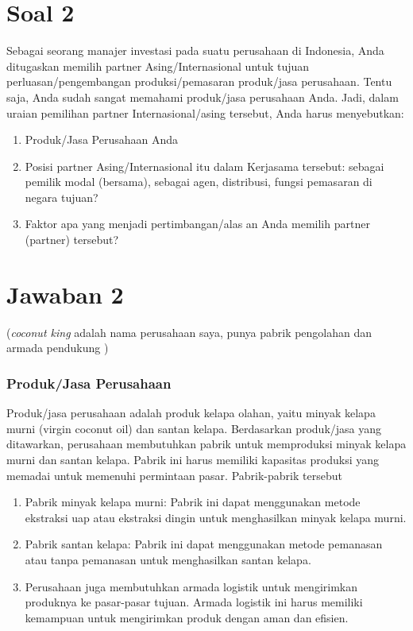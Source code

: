 \documentclass[12pt]{article}
\begin{document}
\section*{Soal 2}
Sebagai seorang manajer investasi pada suatu perusahaan di Indonesia, Anda ditugaskan
memilih partner Asing/Internasional untuk tujuan perluasan/pengembangan
produksi/pemasaran produk/jasa perusahaan. Tentu saja, Anda sudah sangat memahami
produk/jasa perusahaan Anda. Jadi, dalam uraian pemilihan partner Internasional/asing
tersebut, Anda harus menyebutkan:
\begin{enumerate}
  \item Produk/Jasa Perusahaan Anda
  \item Posisi partner Asing/Internasional itu dalam Kerjasama tersebut: sebagai pemilik
  modal (bersama), sebagai agen, distribusi, fungsi pemasaran di negara tujuan?
  \item Faktor apa yang menjadi pertimbangan/alas an Anda memilih partner (partner)
  tersebut?
\end{enumerate}

\section*{Jawaban 2}

(\emph{coconut king} adalah nama perusahaan saya, punya pabrik pengolahan dan armada pendukung )

\subsubsection*{Produk/Jasa Perusahaan}

Produk/jasa perusahaan adalah produk kelapa olahan, yaitu minyak kelapa murni (virgin coconut oil) dan santan kelapa.  Berdasarkan produk/jasa yang ditawarkan, perusahaan membutuhkan pabrik untuk memproduksi minyak kelapa murni dan santan kelapa. Pabrik ini harus memiliki kapasitas produksi yang memadai untuk memenuhi permintaan pasar. Pabrik-pabrik tersebut
\begin{enumerate}
  \item Pabrik minyak kelapa murni: Pabrik ini dapat menggunakan metode ekstraksi uap atau ekstraksi dingin untuk menghasilkan minyak kelapa murni.
  \item Pabrik santan kelapa: Pabrik ini dapat menggunakan metode pemanasan atau tanpa pemanasan untuk menghasilkan santan kelapa.
  \item Perusahaan juga membutuhkan armada logistik untuk mengirimkan produknya ke pasar-pasar tujuan. Armada logistik ini harus memiliki kemampuan untuk mengirimkan produk dengan aman dan efisien.
  
\end{enumerate}
\end{document}
